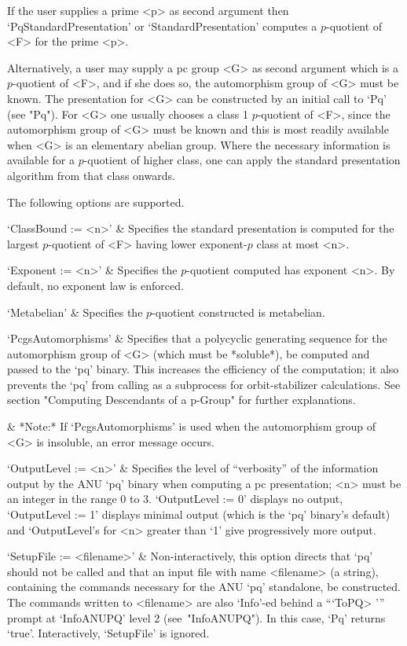 If  the  user  supplies   a   prime   <p>   as   second   argument   then
`PqStandardPresentation'    or    `StandardPresentation'    computes    a
$p$-quotient of <F> for the prime <p>.

Alternatively, a user may supply a pc group <G> as second argument  which
is a $p$-quotient of <F>, and if she does so, the automorphism  group  of
<G> must be known. The presentation for <G>  can  be  constructed  by  an
initial call to `Pq' (see "Pq"). For <G> one usually chooses  a  class  1
$p$-quotient of <F>, since the automorphism group of <G>  must  be  known
and this is most readily available when  <G>  is  an  elementary  abelian
group. Where the necessary information is available for a $p$-quotient of
higher class, one can apply the standard presentation algorithm from that
class onwards.

The following options are supported.

\beginitems
`ClassBound := <n>' &
Specifies  the  standard  presentation  is  computed  for   the   largest
$p$-quotient of <F> having lower expon\-ent-$p$ class at most <n>.

`Exponent := <n>' &
Specifies the $p$-quotient computed has  exponent  <n>.  By  default,  no
exponent law is enforced.

`Metabelian' &
Specifies the $p$-quotient constructed is metabelian.

`PcgsAutomorphisms' &
Specifies that a polycyclic  generating  sequence  for  the  automorphism
group of <G> (which must be *soluble*), be computed  and  passed  to  the
`pq' binary. This increases the efficiency of the  computation;  it  also
prevents  the  `pq'   from   calling   {\GAP}   as   a   subprocess   for
orbit-stabilizer calculations. See section "Computing  Descendants  of  a
p-Group" for further explanations.

&
*Note:*
If `PcgsAutomorphisms' is used when the  automorphism  group  of  <G>  is
insoluble, an error message occurs.

`OutputLevel := <n>' &
Specifies the level of ``verbosity'' of the information output by the ANU
`pq' binary when computing a pc presentation; <n> must be an  integer  in
the range 0 to 3. `OutputLevel := 0' displays no output, `OutputLevel  :=
1' displays minimal output (which  is  the  `pq'  binary's  default)  and
`OutputLevel's for <n> greater than `1' give progressively  more  output.

`SetupFile := <filename>' &
Non-interactively, this option directs that `pq' should not be called and
that an input file  with  name  <filename>  (a  string),  containing  the
commands necessary for the  ANU  `pq'  standalone,  be  constructed.  The
commands written to <filename> are also `Info'-ed behind  a  ```ToPQ> '''
prompt at `InfoANUPQ' level  2  (see~"InfoANUPQ").  In  this  case,  `Pq'
returns `true'. Interactively, `SetupFile' is ignored.

